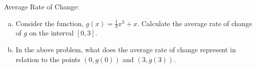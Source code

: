 \documentclass[preview]{standalone}
\begin{document}
\newcommand\function{\frac{1}{3}x^3+x} %
\newcommand\rightend{3} %

Average Rate of Change:
\begin{enumerate}[a)]
\item Consider the function, $g(x)=\function$. Calculate the average rate of change of $g$ on the interval $[0,\rightend]$.


\item In the above problem, what does the average rate of change represent in relation to the points $(0,g(0))$
and $(\rightend,g(\rightend)).$

\end{enumerate}
\end{document}
